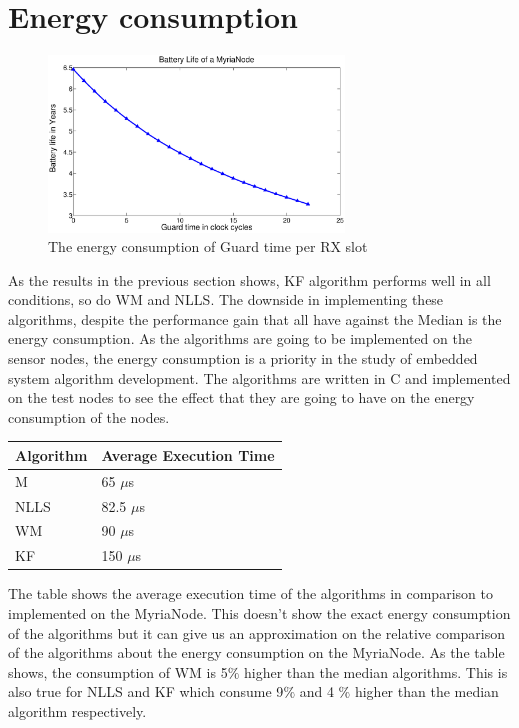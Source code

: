 \documentclass[a4paper,10pt]{report}
\begin{document}
\section{\textbf{Energy consumption}}
\begin{figure}
\centering
\includegraphics[width=0.7\textwidth]{guardsave}
\caption{The energy consumption of Guard time per RX slot}
\label{energyguard}
\end{figure}
As the results in the previous section shows, KF algorithm performs well in all conditions, so do WM and NLLS. The downside in
implementing these algorithms, despite the performance gain that all have against the Median is the energy consumption. As the algorithms are going to be implemented on the sensor nodes, the energy consumption is a priority in the study of embedded system algorithm development. The algorithms are written in C and implemented on the test nodes to see the effect that they are going to have on the energy consumption of the nodes.
\begin{center}
    \begin{tabular}{ |p{2cm} | p{4.75cm} |}
    \hline
    Algorithm & Average Execution Time \\ \hline
    M &  65 $\mu$s \\ \hline
    NLLS & 82.5 $\mu$s \\ \hline
    WM &   90 $\mu$s \\ \hline
    KF &  150 $\mu$s  \\ \hline
    \end{tabular}
\label{tab}
\end{center}
The table shows the average execution time of the algorithms in comparison to implemented on the MyriaNode. This doesn't show the
exact energy consumption of the algorithms but it can give us an approximation on the relative comparison of the algorithms about the energy consumption on the MyriaNode. As the table shows, the consumption of WM is 5$\%$ higher than the median algorithms. This
is also true for NLLS and KF which consume 9$\%$ and 4 $\%$ higher than the median algorithm respectively. 
\end{document}
